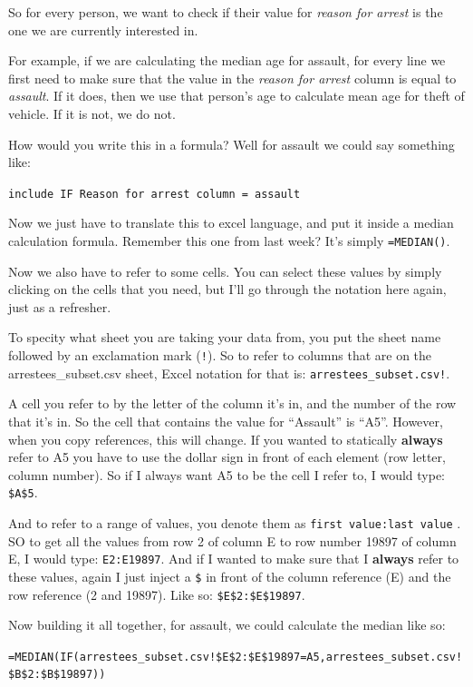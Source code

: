 \documentclass[
]{book}
\begin{document}
So for every person, we want to check if their value for \emph{reason for arrest} is the one we are currently interested in.

For example, if we are calculating the median age for assault, for every line we first need to make sure that the value in the \emph{reason for arrest} column is equal to \emph{assault}. If it does, then we use that person's age to calculate mean age for theft of vehicle. If it is not, we do not.

How would you write this in a formula? Well for assault we could say something like:

\texttt{include\ IF\ \textquotesingle{}Reason\ for\ arrest\ column\textquotesingle{}\ =\ \textquotesingle{}assault\textquotesingle{}}

Now we just have to translate this to excel language, and put it inside a median calculation formula. Remember this one from last week? It's simply \texttt{=MEDIAN()}.

Now we also have to refer to some cells. You can select these values by simply clicking on the cells that you need, but I'll go through the notation here again, just as a refresher.

To specity what sheet you are taking your data from, you put the sheet name followed by an exclamation mark (\texttt{!}). So to refer to columns that are on the arrestees\_subset.csv sheet, Excel notation for that is: \texttt{arrestees\_subset.csv!}.

A cell you refer to by the letter of the column it's in, and the number of the row that it's in. So the cell that contains the value for ``Assault'' is ``A5''. However, when you copy references, this will change. If you wanted to statically \textbf{always} refer to A5 you have to use the dollar sign in front of each element (row letter, column number). So if I always want A5 to be the cell I refer to, I would type: \texttt{\$A\$5}.

And to refer to a range of values, you denote them as \texttt{first\ value:last\ value} . SO to get all the values from row 2 of column E to row number 19897 of column E, I would type: \texttt{E2:E19897}. And if I wanted to make sure that I \textbf{always} refer to these values, again I just inject a \texttt{\$} in front of the column reference (E) and the row reference (2 and 19897). Like so: \texttt{\$E\$2:\$E\$19897}.

Now building it all together, for assault, we could calculate the median like so:

\texttt{=MEDIAN(IF(arrestees\_subset.csv!\$E\$2:\$E\$19897=A5,arrestees\_subset.csv!\$B\$2:\$B\$19897))}
\end{document}
